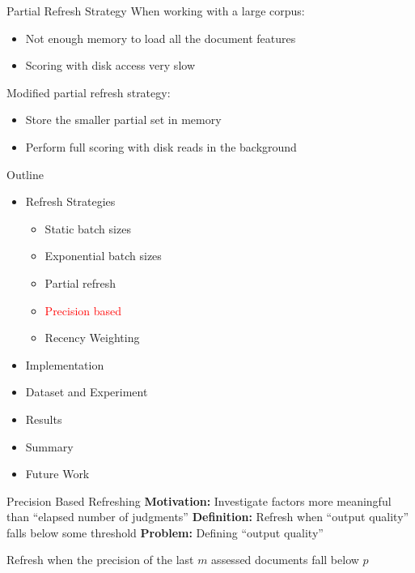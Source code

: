 \documentclass[14pt]{beamer}
\newcommand{\red}[1]{\textcolor{red}{#1}}
\begin{document}
\begin{frame}{Partial Refresh Strategy}
    When working with a large corpus:
    \begin{itemize}
        \item Not enough memory to load all the document features
        \item Scoring with disk access very slow
    \end{itemize}
    \pause
    \vskip 0.5cm
    Modified partial refresh strategy:
    \begin{itemize}
        \item Store the smaller partial set in memory
        \item Perform full scoring with disk reads in the background
    \end{itemize}
\end{frame}


\begin{frame}{Outline}
\begin{itemize}
    \item Refresh Strategies
    \begin{itemize}
        \item Static batch sizes
        \item Exponential batch sizes
        \item Partial refresh
        \item \red{Precision based}
        \item Recency Weighting
    \end{itemize}
    \item Implementation
    \item Dataset and Experiment
    \item Results
    \item Summary
    \item Future Work
\end{itemize}
\end{frame}

\begin{frame}{Precision Based Refreshing}
    \textbf{Motivation:} Investigate factors more meaningful than ``elapsed number
    of judgments''
    \pause
\vskip 1cm
\textbf{Definition:} Refresh when ``output quality'' falls below some threshold
\vskip 0.5cm
\textbf{Problem:} Defining ``output quality''

\pause
\vskip 1cm
Refresh when the precision of the last $m$ assessed documents fall below $p$
\end{frame}
\end{document}
